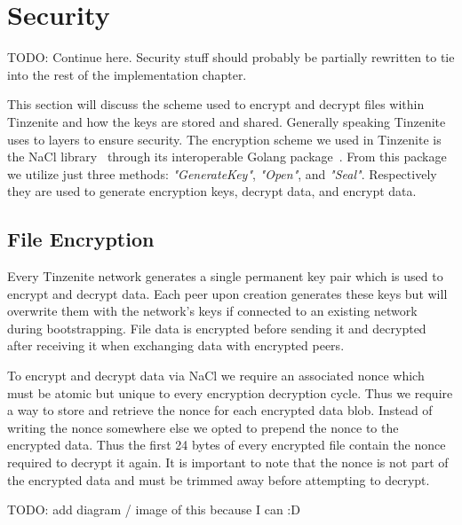 \section{Security}
\label{sec:Security}

TODO: Continue here.
Security stuff should probably be partially rewritten to tie into the rest of the implementation chapter.

This section will discuss the scheme used to encrypt and decrypt files within Tinzenite and how the keys are stored and shared.
Generally speaking Tinzenite uses to layers to ensure security.
The encryption scheme we used in Tinzenite is the NaCl library~\cite{bernstein2012security} through its interoperable Golang package~\cite{web:site:golang:box}.%
From this package we utilize just three methods: \textit{"GenerateKey"}, \textit{"Open"}, and \textit{"Seal"}.
Respectively they are used to generate encryption keys, decrypt data, and encrypt data.

\subsection{File Encryption}
\label{sub:File Encryption}

Every Tinzenite network generates a single permanent key pair which is used to encrypt and decrypt data.
Each peer upon creation generates these keys but will overwrite them with the network's keys if connected to an existing network during bootstrapping.
File data is encrypted before sending it and decrypted after receiving it when exchanging data with encrypted peers.

To encrypt and decrypt data via NaCl we require an associated nonce which must be atomic but unique to every encryption decryption cycle.
Thus we require a way to store and retrieve the nonce for each encrypted data blob.
Instead of writing the nonce somewhere else we opted to prepend the nonce to the encrypted data. %
Thus the first 24 bytes of every encrypted file contain the nonce required to decrypt it again.
It is important to note that the nonce is not part of the encrypted data and must be trimmed away before attempting to decrypt.

TODO: add diagram / image of this because I can :D

